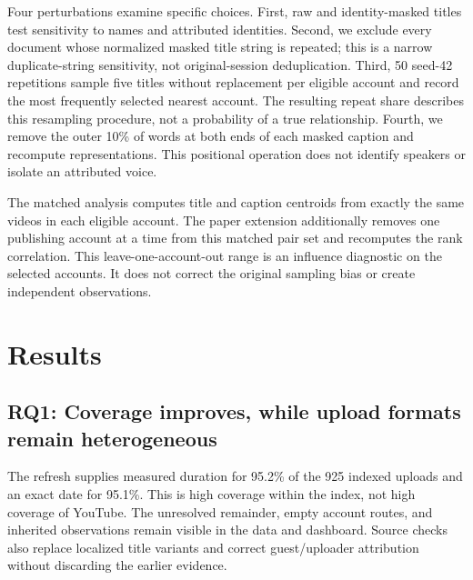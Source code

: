 Four perturbations examine specific choices. First, raw and identity-masked titles test sensitivity to names and attributed identities. Second, we exclude every document whose normalized masked title string is repeated; this is a narrow duplicate-string sensitivity, not original-session deduplication. Third, 50 seed-42 repetitions sample five titles without replacement per eligible account and record the most frequently selected nearest account. The resulting repeat share describes this resampling procedure, not a probability of a true relationship. Fourth, we remove the outer 10\% of words at both ends of each masked caption and recompute representations. This positional operation does not identify speakers or isolate an attributed voice.

The matched analysis computes title and caption centroids from exactly the same videos in each eligible account. The paper extension additionally removes one publishing account at a time from this matched pair set and recomputes the rank correlation. This leave-one-account-out range is an influence diagnostic on the selected accounts. It does not correct the original sampling bias or create independent observations.

\section{Results}
\subsection{RQ1: Coverage improves, while upload formats remain heterogeneous}
The refresh supplies measured duration for 95.2\% of the 925 indexed uploads and an exact date for 95.1\%. This is high coverage within the index, not high coverage of YouTube. The unresolved remainder, empty account routes, and inherited observations remain visible in the data and dashboard. Source checks also replace localized title variants and correct guest/uploader attribution without discarding the earlier evidence.

\begin{table}[t]
\centering

\caption{Selected publishing accounts emphasized in the research brief. Durations are minutes; $n/N$ is measured/indexed uploads. Means and medians describe these samples. Selection is illustrative, not a ranking. Full quartiles and all groups are in the released CSV.}
\label{tab:duration}
\end{table}

